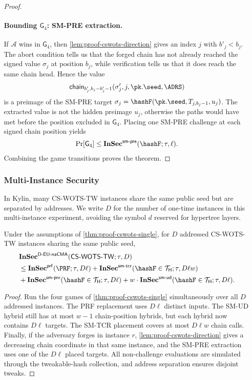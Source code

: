 \begin{proof}
\paragraph{Bounding $\mathsf{G}_4$: SM-PRE extraction.}
If $\mathcal{A}$ wins in $\mathsf{G}_4$, then
\cref{lem:proof-cswots-direction} gives an index $j$ with $b'_j<b_j$.  The
abort condition tells us that the forged chain has not already reached the
signed value $\sigma_j$ at position $b_j$, while verification tells us that it
does reach the same chain head.  Hence the value
\[
    \Chain_{b'_j,b_j-b'_j-1}(\sigma'_j,j,\pk.\seed,\ADRS)
\]
is a preimage of the SM-PRE target
$\sigma_j=\hashF(\pk.\seed,T_{j,b_j-1},u_j)$.  The extracted value is not the
hidden preimage $u_j$, otherwise the paths would have met before the position
excluded in $\mathsf{G}_4$.  Placing one SM-PRE challenge at each signed chain
position yields
\[
    \Pr[\mathsf{G}_4]\le
    \InSec{sm\text{-}pre}(\hashF;\tau,\ell).
\]
Combining the game transitions proves the theorem.
\end{proof}

\subsubsection{Multi-Instance Security}
\label{sec:proof-cswots-multi}

In Kylin, many CS-WOTS-TW instances share the same public seed but are
separated by addresses.  We write $D$ for the number of one-time instances in
this multi-instance experiment, avoiding the symbol $d$ reserved for hypertree
layers.

\begin{theorem}
\label{thm:proof-cswots-multi}
Under the assumptions of \cref{thm:proof-cswots-single}, for $D$ addressed
CS-WOTS-TW instances sharing the same public seed,
\begin{align}
&\InSec{D\text{-}EU\text{-}naCMA}
    (\mathsf{CS\text{-}WOTS\text{-}TW};\tau,D) \notag\\
&\le{}
    \InSec{prf}(\PRF;\tau,D\ell)
    +\InSec{sm\text{-}tcr}(\hashF\in\THFColl;\tau,D\ell w) \notag\\
&   +\InSec{sm\text{-}pre}(\hashF\in\THFColl;\tau,D\ell)
    +w\cdot\InSec{sm\text{-}ud}(\hashF\in\THFColl;\tau,D\ell).
\label{eq:proof-cswots-multi}
\end{align}
\end{theorem}

\begin{proof}
Run the four games of \cref{thm:proof-cswots-single} simultaneously over all
$D$ addressed instances.  The PRF replacement uses $D\ell$ distinct inputs.
The SM-UD hybrid still has at most $w-1$ chain-position hybrids, but each
hybrid now contains $D\ell$ targets.  The SM-TCR placement covers at most
$D\ell w$ chain calls.  Finally, if the adversary forges in instance $r$,
\cref{lem:proof-cswots-direction} gives a decreasing chain coordinate in that
same instance, and the SM-PRE extraction uses one of the $D\ell$ placed
targets.  All non-challenge evaluations are simulated through the
tweakable-hash collection, and address separation ensures disjoint tweaks.
\end{proof}

